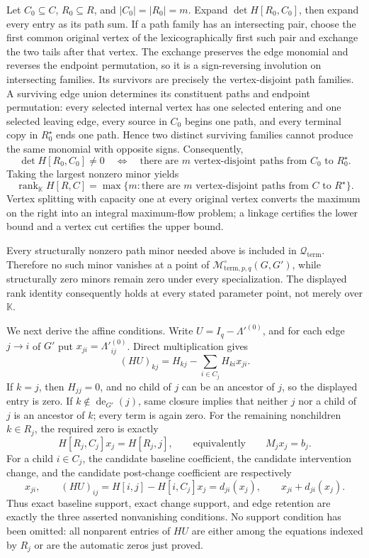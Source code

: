 Let \(C_0\subseteq C\), \(R_0\subseteq R\), and \(|C_0|=|R_0|=m\).  Expand \(\det H[R_0,C_0]\), then expand every entry as its path sum.  If a path family has an intersecting pair, choose the first common original vertex of the lexicographically first such pair and exchange the two tails after that vertex.  The exchange preserves the edge monomial and reverses the endpoint permutation, so it is a sign-reversing involution on intersecting families.  Its survivors are precisely the vertex-disjoint path families.  A surviving edge union determines its constituent paths and endpoint permutation: every selected internal vertex has one selected entering and one selected leaving edge, every source in \(C_0\) begins one path, and every terminal copy in \(R_0^\star\) ends one path.  Hence two distinct surviving families cannot produce the same monomial with opposite signs.  Consequently,
\[
 \det H[R_0,C_0]\ne0
 \quad\Longleftrightarrow\quad
 \text{there are \(m\) vertex-disjoint paths from \(C_0\) to \(R_0^\star\)}.
\]
Taking the largest nonzero minor yields
\[
 \operatorname{rank}_{\mathbb K}H[R,C]
 =\max\bigl\{m:\text{there are \(m\) vertex-disjoint paths from \(C\) to \(R^\star\)}\bigr\}.
\]
Vertex splitting with capacity one at every original vertex converts the maximum on the right into an integral maximum-flow problem; a linkage certifies the lower bound and a vertex cut certifies the upper bound.

Every structurally nonzero path minor needed above is included in \(\mathcal Q_{\mathrm{term}}\).  Therefore no such minor vanishes at a point of \(\mathcal M^{\circ}_{\mathrm{term},p,q}(G,G')\), while structurally zero minors remain zero under every specialization.  The displayed rank identity consequently holds at every stated parameter point, not merely over \(\mathbb K\).

We next derive the affine conditions.  Write \(U=I_q-\Lambda'^{(0)}\), and for each edge \(j\to i\) of \(G'\) put \(x_{ji}=\Lambda'^{(0)}_{ij}\).  Direct multiplication gives
\[
 (HU)_{kj}=H_{kj}-\sum_{i\in C_j}H_{ki}x_{ji}.
\]
If \(k=j\), then \(H_{jj}=0\), and no child of \(j\) can be an ancestor of \(j\), so the displayed entry is zero.  If \(k\notin\operatorname{de}_{G'}(j)\), same closure implies that neither \(j\) nor a child of \(j\) is an ancestor of \(k\); every term is again zero.  For the remaining nonchildren \(k\in R_j\), the required zero is exactly
\[
 H[R_j,C_j]x_j=H[R_j,j],
 \qquad\text{equivalently}\qquad M_jx_j=b_j.
\]
For a child \(i\in C_j\), the candidate baseline coefficient, the candidate intervention change, and the candidate post-change coefficient are respectively
\[
 x_{ji},\qquad
 (HU)_{ij}=H[i,j]-H[i,C_j]x_j=d_{ji}(x_j),\qquad
 x_{ji}+d_{ji}(x_j).
\]
Thus exact baseline support, exact change support, and edge retention are exactly the three asserted nonvanishing conditions.  No support condition has been omitted: all nonparent entries of \(HU\) are either among the equations indexed by \(R_j\) or are the automatic zeros just proved.

